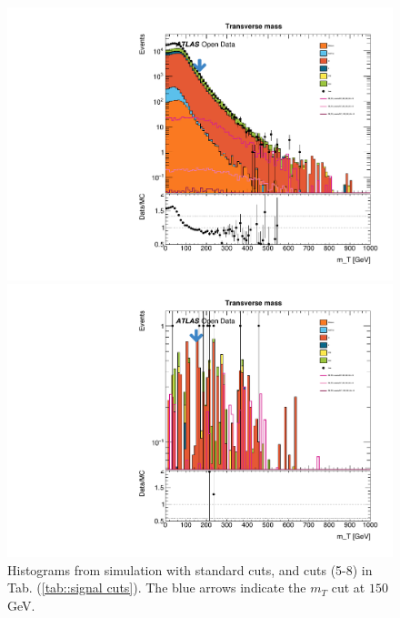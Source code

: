 \documentclass[11pt]{article}
\begin{document}
\begin{figure}[H]
\centering

\begin{minipage}{.5\textwidth}
  \centering
  \includegraphics[width=1.\linewidth]{plots/Standard_Cut/cropped_mt_edited.pdf}
\end{minipage}%
\begin{minipage}{.5\textwidth}
  \centering
  \includegraphics[width=1.\linewidth]{plots/Consider_mt_etmiss500/cropped_mt-2.pdf}
\end{minipage}

\caption{Histograms from simulation with standard cuts, and cuts (5-8) in Tab. (\ref{tab::signal cuts}). The blue arrows indicate the $m_T$ cut at $150$ GeV.}
\label{fig:: mt hist}
\end{figure}
\end{document}
